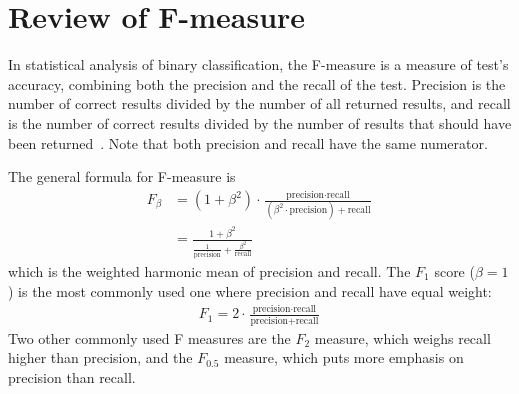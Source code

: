 \chapter{Review of F-measure}\label{app:fmeasure}
In statistical analysis of binary classification, the F-measure is a measure of
test's accuracy, combining both the precision and the recall of the test.
Precision is the number of correct results divided by
the number of all returned results, and recall is the number of correct
results divided by the number of results that should have been
returned~\cite{f1score14}. Note that both precision and recall have the same
numerator.

The general formula for F-measure is
\begin{align*}
F_\beta &= (1 + \beta^2)\cdot\frac{\text{precision}\cdot
\text{recall}}{(\beta^2\cdot\text{precision}) + \text{recall}}\\
&= \frac{1 + \beta^2}{\frac{1}{\text{precision}}+\frac{\beta^2}{\text{recall}}}
\end{align*}
which is the weighted harmonic mean of precision and recall. The $F_1$ score
($\beta=1$) is the most commonly used one where precision and recall have
equal weight:
\begin{align*}
F_1 = 2\cdot\frac{\text{precision}\cdot
\text{recall}}{\text{precision} + \text{recall}}
\end{align*}
Two other commonly used F measures are the $F_2$ measure, which weighs recall
higher than precision, and the $F_{0.5}$ measure, which puts more emphasis on
precision than recall.

